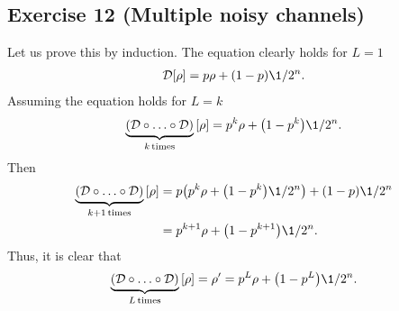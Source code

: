 \subsection{Exercise 12 (Multiple noisy channels)}
Let us prove this by induction. The equation clearly holds for $L=1$
\begin{align}
\D\qty[\rho]=p\rho+\qty(1-p)\1/2^n.
\end{align}
Assuming the equation holds for $L=k$
\begin{align}
\underbrace{\qty(\D\circ\ldots\circ\D)}_{k\,\text{times}}\qty[\rho]=p^k\rho+\qty(1-p^k)\1/2^n.
\end{align}
Then
\begin{subequations}
\begin{align}
\underbrace{\qty(\D\circ\ldots\circ\D)}_{k+1\,\text{times}}\qty[\rho]&=
	p\qty(p^k\rho+\qty(1-p^k)\1/2^n)+\qty(1-p)\1/2^n\\
&=p^{k+1}\rho+\qty(1-p^{k+1})\1/2^n.
\end{align}
\end{subequations}
Thus, it is clear that 
\begin{align}
\underbrace{\qty(\D\circ\ldots\circ\D)}_{L\,\text{times}}\qty[\rho]=\rho'=
	p^{L}\rho+\qty(1-p^{L})\1/2^n.
\end{align}